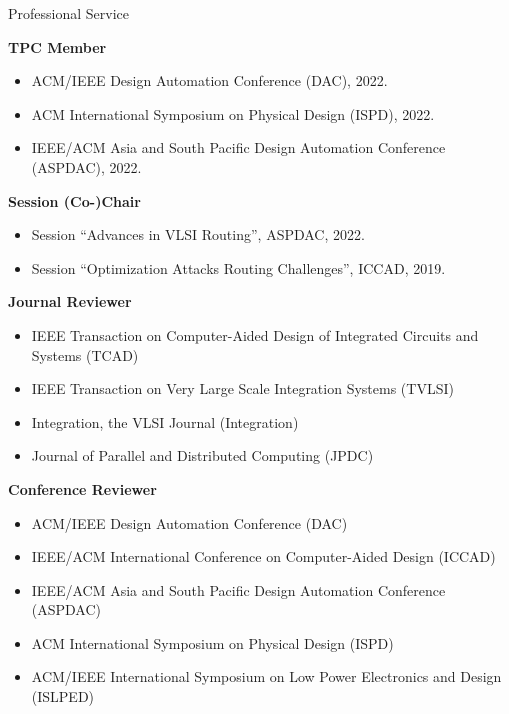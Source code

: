 
\begin{rSection}{Professional Service}

\textbf{TPC Member}
\begin{itemize}
    \item ACM/IEEE Design Automation Conference (DAC), 2022.
    \item ACM International Symposium on Physical Design (ISPD), 2022.
    \item IEEE/ACM Asia and South Pacific Design Automation Conference (ASPDAC), 2022.
\end{itemize}

\textbf{Session (Co-)Chair}
\begin{itemize}
    \item Session ``Advances in VLSI Routing'', ASPDAC, 2022.
    \item Session ``Optimization Attacks Routing Challenges'', ICCAD, 2019.
\end{itemize}

\textbf{Journal Reviewer}
\begin{itemize}
    \item IEEE Transaction on Computer-Aided Design of Integrated Circuits and Systems (TCAD)
    \item IEEE Transaction on Very Large Scale Integration Systems (TVLSI)
    \item Integration, the VLSI Journal (Integration)
    \item Journal of Parallel and Distributed Computing (JPDC)
\end{itemize}

\textbf{Conference Reviewer}
\begin{itemize}
    \item ACM/IEEE Design Automation Conference (DAC)
    \item IEEE/ACM International Conference on Computer-Aided Design (ICCAD)
    \item IEEE/ACM Asia and South Pacific Design Automation Conference (ASPDAC)
    \item ACM International Symposium on Physical Design (ISPD)
    \item ACM/IEEE International Symposium on Low Power Electronics and Design (ISLPED)
\end{itemize}
\end{rSection}


